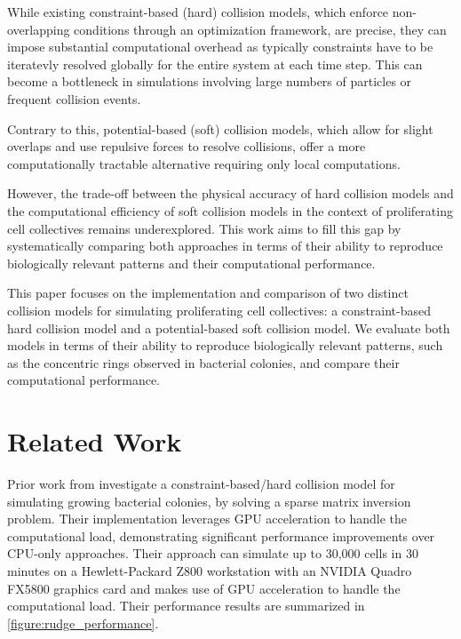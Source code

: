 \documentclass[conference]{IEEEtran}
\begin{document}
While existing constraint-based (hard) collision models, which enforce non-overlapping conditions through an optimization framework, are precise, they can impose substantial computational overhead as typically constraints have to be iteratevly resolved globally for the entire system at each time step. This can become a bottleneck in simulations involving large numbers of particles or frequent collision events.

Contrary to this, potential-based (soft) collision models, which allow for slight overlaps and use repulsive forces to resolve collisions, offer a more computationally tractable alternative requiring only local computations.

However, the trade-off between the physical accuracy of hard collision models and the computational efficiency of soft collision models in the context of proliferating cell collectives remains underexplored. This work aims to fill this gap by systematically comparing both approaches in terms of their ability to reproduce biologically relevant patterns and their computational performance.

This paper focuses on the implementation and comparison of two distinct collision models for simulating proliferating cell collectives: a constraint-based hard collision model and a potential-based soft collision model. We evaluate both models in terms of their ability to reproduce biologically relevant patterns, such as the concentric rings observed in bacterial colonies, and compare their computational performance.

\section{Related Work}




Prior work from \cite{Rudge2012} investigate a constraint-based/hard collision model for simulating growing bacterial colonies, by solving a sparse matrix inversion problem. Their implementation leverages GPU acceleration to handle the computational load, demonstrating significant performance improvements over CPU-only approaches. Their approach can simulate up to 30,000 cells in 30 minutes on a Hewlett-Packard Z800 workstation with an NVIDIA Quadro FX5800 graphics card and makes use of GPU acceleration to handle the computational load. Their performance results are summarized in \autoref{figure:rudge_performance}.
\end{document}
